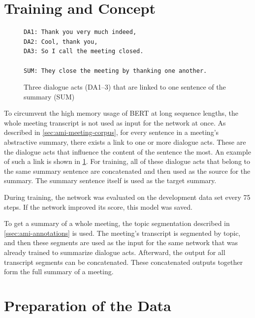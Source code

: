
\section{Training and Concept}\label{sec:system-description-training}

\begin{figure}[h]
\begin{lstlisting}[numbers=none]
DA1: Thank you very much indeed,
DA2: Cool, thank you,
DA3: So I call the meeting closed.

SUM: They close the meeting by thanking one another.
\end{lstlisting}
\caption{Three dialogue acts (DA1--3) that are linked to one sentence of the summary (SUM)}
\label{fig:dialogue-arc-summary-link-example}
\end{figure}

To circumvent the high memory usage of BERT at long sequence lengths, the whole meeting transcript is not used as input for the network at once.
As described in \cref{sec:ami-meeting-corpus}, for every sentence in a meeting's abstractive summary, there exists a link to one or more dialogue acts.
These are the dialogue acts that influence the content of the sentence the most.
An example of such a link is shown in \cref{fig:dialogue-arc-summary-link-example}.
For training, all of these dialogue acts that belong to the same summary sentence are concatenated and then used as the source for the summary.
The summary sentence itself is used as the target summary.

During training, the network was evaluated on the development data set every 75 steps.
If the network improved its score, this model was saved.

To get a summary of a whole meeting, the topic segmentation described in \cref{ssec:ami-annotations} is used.
The meeting's transcript is segmented by topic, and then these segments are used as the input for the same network that was already trained to summarize dialogue acts.
Afterward, the output for all transcript segments can be concatenated.
These concatenated outputs together form the full summary of a meeting. 

\section{Preparation of the Data}\label{sec:preparation-of-the-data}

